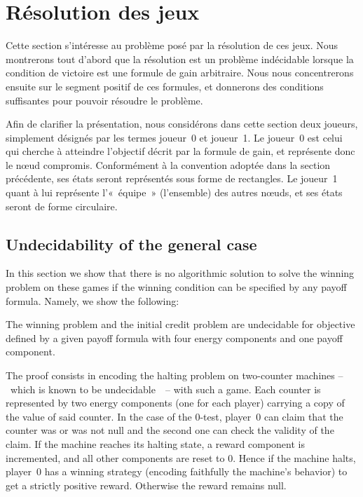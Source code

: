 \section{Résolution des jeux}
\label{tj:sec:algo}

Cette section s'intéresse au problème posé par la résolution de ces jeux.
Nous montrerons tout d'abord que la résolution est un problème indécidable lorsque la condition de victoire est une formule de gain arbitraire.
Nous nous concentrerons ensuite sur le segment positif de ces formules, et donnerons des conditions suffisantes pour pouvoir résoudre le problème.

\newcommand\jo{joueur~0\xspace}
\newcommand\ji{joueur~1\xspace}
Afin de clarifier la présentation, nous considérons dans cette section deux joueurs, simplement désignés par les termes \jo et \ji.
Le \jo est celui qui cherche à atteindre l'objectif décrit par la formule de gain, et représente donc le nœud compromis.
Conformément à la convention adoptée dans la section précédente, ses états seront représentés sous forme de rectangles.
Le \ji quant à lui représente l'« équipe » (l'ensemble) des autres nœuds, et ses états seront de forme circulaire.

\subsection{Undecidability of the general case}

In this section we show that there is no algorithmic solution to solve the winning problem on these games if the winning condition can be specified by any payoff formula.
Namely, we show the following:
\begin{theorem}
The winning problem and the initial credit problem are undecidable for objective defined by a given payoff formula with four energy components and one payoff component.
\end{theorem}

The proof consists in encoding the halting problem on two-counter machines --~which is known to be undecidable~\cite{minsky67}~-- with such a game.
Each counter is represented by two energy components (one for each player) carrying a copy of the value of said counter.
In the case of the $0$-test, player~0 can claim that the counter was or was not null and the second one can check the validity of the claim.
If the machine reaches its halting state, a reward component is incremented, and all other components are reset to $0$.
Hence if the machine halts, player~0 has a winning strategy (encoding faithfully the machine's behavior) to get a strictly positive reward.
Otherwise the reward remains null. 

